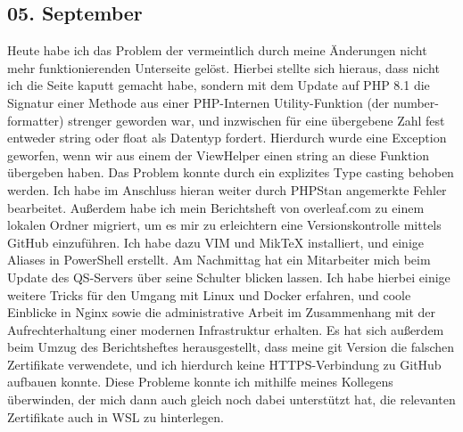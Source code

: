 \subsection{05. September}
Heute habe ich das Problem der vermeintlich durch meine Änderungen nicht mehr funktionierenden Unterseite gelöst. Hierbei stellte sich hieraus, dass nicht ich die Seite kaputt gemacht habe, sondern mit dem Update auf PHP 8.1 die Signatur einer Methode aus einer PHP-Internen Utility-Funktion (der number-formatter) strenger geworden war, und inzwischen für eine übergebene Zahl fest entweder string oder float als Datentyp fordert. Hierdurch wurde eine Exception geworfen, wenn wir aus einem der ViewHelper einen string an diese Funktion übergeben haben. Das Problem konnte durch ein explizites Type casting behoben werden. Ich habe im Anschluss hieran weiter durch PHPStan angemerkte Fehler bearbeitet. Außerdem habe ich mein Berichtsheft von overleaf.com zu einem lokalen Ordner migriert, um es mir zu erleichtern eine Versionskontrolle mittels GitHub einzuführen. Ich habe dazu VIM und MikTeX installiert, und einige Aliases in PowerShell erstellt. Am Nachmittag hat ein Mitarbeiter mich beim Update des QS-Servers über seine Schulter blicken lassen. Ich habe hierbei einige weitere Tricks für den Umgang mit Linux und Docker erfahren, und coole Einblicke in Nginx sowie die administrative Arbeit im Zusammenhang mit der Aufrechterhaltung einer modernen Infrastruktur erhalten.
Es hat sich außerdem beim Umzug des Berichtsheftes herausgestellt, dass meine git Version die falschen Zertifikate verwendete, und ich hierdurch keine HTTPS-Verbindung zu GitHub aufbauen konnte. Diese Probleme konnte ich mithilfe meines Kollegens überwinden, der mich dann auch gleich noch dabei unterstützt hat, die relevanten Zertifikate auch in WSL zu hinterlegen.
